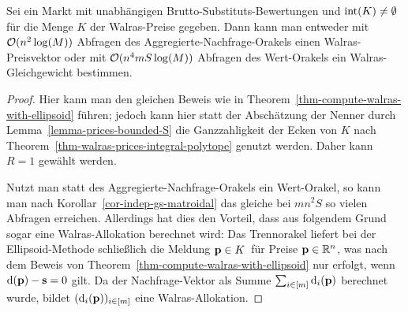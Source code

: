 \begin{theorem}
	Sei ein Markt mit unabhängigen Brutto-Substituts-Bewertungen und $\operatorname{int}(K)\neq \emptyset$ für die Menge $K$ der Walras-Preise gegeben.
	Dann kann man entweder mit $\mathcal{O}(n^2\log(M))$ Abfragen des Aggregierte-Nachfrage-Orakels einen Walras-Preisvektor oder mit $\mathcal{O}(n^4 m S\log(M))$ Abfragen des Wert-Orakels ein Walras-Gleichgewicht bestimmen.
\end{theorem}
\begin{proof}
	Hier kann man den gleichen Beweis wie in Theorem~\ref{thm-compute-walras-with-ellipsoid} führen; jedoch kann hier statt der Abschätzung der Nenner durch Lemma~\ref{lemma-prices-bounded-S} die Ganzzahligkeit der Ecken von $K$ nach Theorem~\ref{thm-walras-prices-integral-polytope} genutzt werden.
	Daher kann $R=1$ gewählt werden.
	
	Nutzt man statt des Aggregierte-Nachfrage-Orakels ein Wert-Orakel, so kann man nach Korollar~\ref{cor-indep-gs-matroidal} das gleiche bei $mn^2S$ so vielen Abfragen erreichen.
	Allerdings hat dies den Vorteil, dass aus folgendem Grund sogar eine Walras-Allokation berechnet wird:
	Das Trennorakel liefert bei der Ellipsoid-Methode schließlich die Meldung \glqq$\mathbf{p}\in K$\grqq\ für Preise $\mathbf{p}\in\mathbb{R}^n$, was nach dem Beweis von Theorem~\ref{thm-compute-walras-with-ellipsoid} nur erfolgt, wenn $\operatorname{d}(\mathbf{p}) - \mathbf{s} = 0$ gilt.
	Da der Nachfrage-Vektor als Summe $\sum_{i\in\left[ m \right]} \operatorname{d}_i(\mathbf{p})$ berechnet wurde, bildet $(\operatorname{d}_i(\mathbf{p}))_{i\in\left[ m \right]}$ eine Walras-Allokation.
\end{proof}